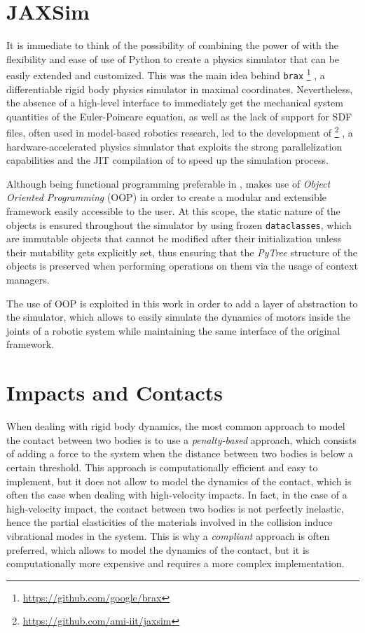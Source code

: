 \section{JAXSim}

It is immediate to think of the possibility of combining the power of \jax with the flexibility and ease of use of Python to create a physics simulator that can be easily extended and customized. This was the main idea behind \texttt{brax} \footnote{\url{https://github.com/google/brax}} \citep{freeman_brax_2021}, a differentiable rigid body physics simulator in maximal coordinates. Nevertheless, the absence of a high-level interface to immediately get the mechanical system quantities of the Euler-Poincare equation, as well as the lack of support for \ac{SDF} files, often used in model-based robotics research, led to the development of \jaxsim \footnote{\url{https://github.com/ami-iit/jaxsim}} \citep{ferigo_jaxsim_2022}, a hardware-accelerated physics simulator that exploits the strong parallelization capabilities and the \ac{JIT} compilation of \jax to speed up the simulation process.

Although being functional programming preferable in \jax, \jaxsim makes use of \textit{Object Oriented Programming} (\ac{OOP}) in order to create a modular and extensible framework easily accessible to the user. At this scope, the static nature of the objects is ensured throughout the simulator by using frozen \texttt{dataclasses}, which are immutable objects that cannot be modified after their initialization unless their mutability gets explicitly set, thus ensuring that the \textit{PyTree} structure of the objects is preserved when performing operations on them via the usage of context managers.

The use of \ac{OOP} is exploited in this work in order to add a layer of abstraction to the simulator, which allows to easily simulate the dynamics of motors inside the joints of a robotic system while maintaining the same interface of the original \jaxsim framework.


\section{Impacts and Contacts}
\label{sec:back_contacts}

When dealing with rigid body dynamics, the most common approach to model the contact between two bodies is to use a \textit{penalty-based} approach, which consists of adding a force to the system when the distance between two bodies is below a certain threshold. This approach is computationally efficient and easy to implement, but it does not allow to model the dynamics of the contact, which is often the case when dealing with high-velocity impacts. In fact, in the case of a high-velocity impact, the contact between two bodies is not perfectly inelastic, hence the partial elasticities of the materials involved in the collision induce vibrational modes in the system. This is why a \textit{compliant} approach is often preferred, which allows to model the dynamics of the contact, but it is computationally more expensive and requires a more complex implementation.

